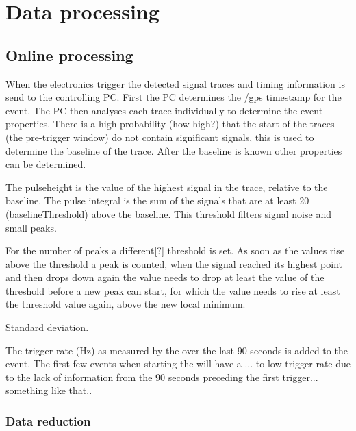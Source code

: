 \chapter{Data processing}
\label{ch:data_processing}

\section{Online processing}

When the \hisparc electronics trigger the detected signal traces and timing information is send to the controlling PC. First the PC determines the /gps timestamp for the event. The PC then analyses each trace individually to determine the event properties. There is a high probability (how high?) that the start of the traces (the pre-trigger window) do not contain significant signals, this is used to determine the baseline of the trace. After the baseline is known other properties can be determined.

The pulseheight is the value of the highest signal in the trace, relative to the baseline. The pulse integral is the sum of the signals that are at least \SI{20}{\adc} (baselineThreshold) above the baseline. This threshold filters signal noise and small peaks.

For the number of peaks a different[?] threshold is set. As soon as the values rise above the threshold a peak is counted, when the signal reached its highest point and then drops down again the value needs to drop at least the value of the threshold before a new peak can start, for which the value needs to rise at least the threshold value again, above the new local minimum.

Standard deviation.

The trigger rate (Hz) as measured by the \daq over the last 90 seconds is added to the event. The first few events when starting the \daq will have a ... to low trigger rate due to the lack of information from the 90 seconds preceding the first trigger... something like that..


\subsection{Data reduction}

\cite{oostenbrugge2014}

